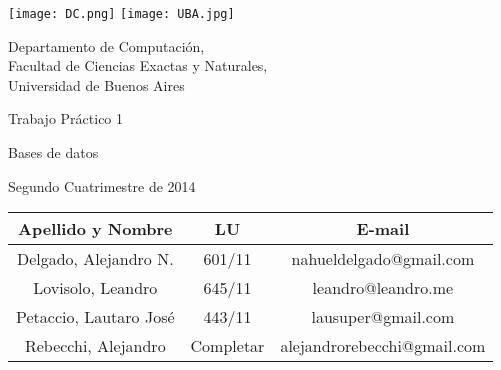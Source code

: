 \documentclass[a4paper, 10pt, twoside]{article}
\newcommand{\titulo}{Trabajo Práctico 1}
\newcommand{\materia}{Bases de datos}
\newcommand{\cuatrimestre}{Segundo Cuatrimestre de 2014}
\begin{document}


\thispagestyle{caratula}

\begin{center}

\texttt{[image: DC.png]} 
\hfill
\texttt{[image: UBA.jpg]} 

\vspace{2cm}

Departamento de Computación,\\
Facultad de Ciencias Exactas y Naturales,\\
Universidad de Buenos Aires

\vspace{4cm}

\begin{Huge}
\titulo
\end{Huge}

\vspace{0.5cm}

\begin{Large}
\materia
\end{Large}

\vspace{1cm}

\cuatrimestre

\vspace{4cm}

\begin{tabular}{|c|c|c|}
\hline
Apellido y Nombre & LU & E-mail\\
\hline
Delgado, Alejandro N.  & 601/11 & nahueldelgado@gmail.com\\
Lovisolo, Leandro      & 645/11 & leandro@leandro.me\\
Petaccio, Lautaro José & 443/11 & lausuper@gmail.com\\
Rebecchi, Alejandro & Completar & alejandrorebecchi@gmail.com\\
\hline
\end{tabular}

\end{center}

\newpage


\end{document}

